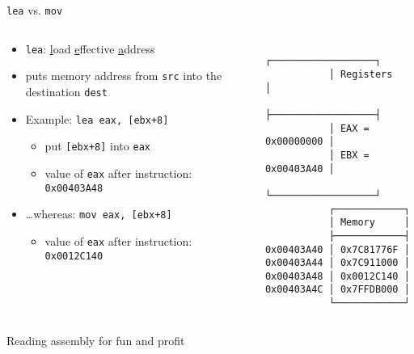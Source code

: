 \begin{frame}[fragile]{\texttt{lea} vs. \texttt{mov}}
    \begin{columns}
        \begin{column}{.5\textwidth}
            \begin{itemize}
                \item \texttt{lea}: \underline{l}oad \underline{e}ffective \underline{a}ddress
                \item puts memory address from \texttt{src} into the destination \texttt{dest}
                \item Example: \texttt{lea eax, [ebx+8]}
                \begin{itemize}
                    \item put \texttt{[ebx+8]} into \texttt{eax}
                    \item value of \texttt{eax} after instruction: \texttt{0x00403A48}
                \end{itemize}
                \item \ldots whereas: \texttt{mov eax, [ebx+8]}
                \begin{itemize}
                    \item value of \texttt{eax} after instruction: \texttt{0x0012C140}
                \end{itemize}
            \end{itemize}
        \end{column}
        \begin{column}{.5\textwidth}
            \begin{Verbatim}
           ┌──────────────────┐
           │ Registers        │
           ├──────────────────┤
           │ EAX = 0x00000000 │ 
           │ EBX = 0x00403A40 │ 
           └──────────────────┘
           ┌────────────┐
           │ Memory     │
           ├────────────┤
0x00403A40 │ 0x7C81776F │ 
0x00403A44 │ 0x7C911000 │ 
0x00403A48 │ 0x0012C140 │ 
0x00403A4C │ 0x7FFDB000 │ 
           └────────────┘
            \end{Verbatim}
        \end{column}
    \end{columns}
\end{frame}

\begin{frame}[fragile]{Reading assembly for fun and profit}
    \begin{columns}[t]
        \begin{column}{.45\textwidth}
            
        \end{column}
        \begin{column}{.45\textwidth}
        \end{column}
    \end{columns}
\end{frame}

